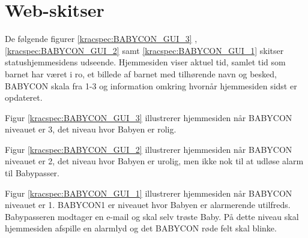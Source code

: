 \section{Web-skitser} \label{Ikke-funk:webskitser}


De følgende figurer \ref{kracspec:BABYCON_GUI_3} , \ref{kracspec:BABYCON_GUI_2} samt \ref{kracspec:BABYCON_GUI_1} skitser statushjemmesidens udseende. Hjemmesiden viser aktuel tid, samlet tid som barnet har været i ro, et billede af barnet med tilhørende navn og besked, BABYCON skala fra 1-3 og information omkring hvornår hjemmesiden sidst er opdateret.


Figur \ref{kracspec:BABYCON_GUI_3} illustrerer hjemmesiden når BABYCON niveauet er 3, det niveau hvor Babyen er rolig.


Figur \ref{kracspec:BABYCON_GUI_2} illustrerer hjemmesiden når BABYCON niveauet er 2, det niveau hvor Babyen er urolig, men ikke nok til at udløse alarm til Babypasser.


Figur \ref{kracspec:BABYCON_GUI_1} illustrerer hjemmesiden når BABYCON niveauet er 1. BABYCON1 er niveauet hvor Babyen er alarmerende utilfreds. Babypasseren modtager en e-mail og skal selv trøste Baby. På dette niveau skal hjemmesiden afspille en alarmlyd og det BABYCON røde felt skal blinke.